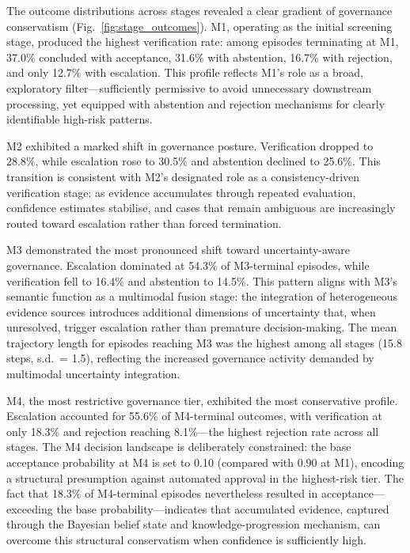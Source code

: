 \documentclass{article}
\begin{document}
The outcome distributions across stages revealed a clear gradient of governance conservatism (Fig.~\ref{fig:stage_outcomes}). M1, operating as the initial screening stage, produced the highest verification rate: among episodes terminating at M1, 37.0\% concluded with acceptance, 31.6\% with abstention, 16.7\% with rejection, and only 12.7\% with escalation. This profile reflects M1's role as a broad, exploratory filter—sufficiently permissive to avoid unnecessary downstream processing, yet equipped with abstention and rejection mechanisms for clearly identifiable high-risk patterns.

M2 exhibited a marked shift in governance posture. Verification dropped to 28.8\%, while escalation rose to 30.5\% and abstention declined to 25.6\%. This transition is consistent with M2's designated role as a consistency-driven verification stage: as evidence accumulates through repeated evaluation, confidence estimates stabilise, and cases that remain ambiguous are increasingly routed toward escalation rather than forced termination.

M3 demonstrated the most pronounced shift toward uncertainty-aware governance. Escalation dominated at 54.3\% of M3-terminal episodes, while verification fell to 16.4\% and abstention to 14.5\%. This pattern aligns with M3's semantic function as a multimodal fusion stage: the integration of heterogeneous evidence sources introduces additional dimensions of uncertainty that, when unresolved, trigger escalation rather than premature decision-making. The mean trajectory length for episodes reaching M3 was the highest among all stages (15.8 steps, s.d.\ = 1.5), reflecting the increased governance activity demanded by multimodal uncertainty integration.

M4, the most restrictive governance tier, exhibited the most conservative profile. Escalation accounted for 55.6\% of M4-terminal outcomes, with verification at only 18.3\% and rejection reaching 8.1\%—the highest rejection rate across all stages. The M4 decision landscape is deliberately constrained: the base acceptance probability at M4 is set to 0.10 (compared with 0.90 at M1), encoding a structural presumption against automated approval in the highest-risk tier. The fact that 18.3\% of M4-terminal episodes nevertheless resulted in acceptance—exceeding the base probability—indicates that accumulated evidence, captured through the Bayesian belief state and knowledge-progression mechanism, can overcome this structural conservatism when confidence is sufficiently high.
\end{document}
